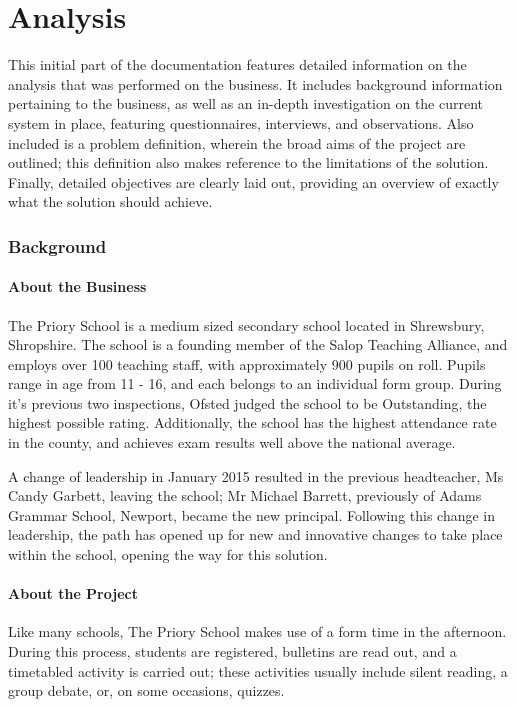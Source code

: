 \part{Analysis}
This initial part of the documentation features detailed information on the analysis that was performed on the business. It includes background information pertaining to the business, as well as an in-depth investigation on the current system in place, featuring questionnaires, interviews, and observations. Also included is a problem definition, wherein the broad aims of the project are outlined; this definition also makes reference to the limitations of the solution. Finally, detailed objectives are clearly laid out, providing an overview of exactly what the solution should achieve.

\section{Background}

\subsection{About the Business}
The Priory School is a medium sized secondary school located in Shrewsbury, Shropshire. The school is a founding member of the Salop Teaching Alliance, and employs over 100 teaching staff, with approximately 900 pupils on roll. Pupils range in age from 11 - 16, and each belongs to an individual form group. During it's previous two inspections, Ofsted judged the school to be Outstanding, the highest possible rating. Additionally, the school has the highest attendance rate in the county, and achieves exam results well above the national average. 

A change of leadership in January 2015 resulted in the previous headteacher, Ms Candy Garbett, leaving the school; Mr Michael Barrett, previously of Adams Grammar School, Newport, became the new principal. Following this change in leadership, the path has opened up for new and innovative changes to take place within the school, opening the way for this solution.

\subsection{About the Project}
Like many schools, The Priory School makes use of a form time in the afternoon. During this process, students are registered, bulletins are read out, and a timetabled activity is carried out; these activities usually include silent reading, a group debate, or, on some occasions, quizzes.

